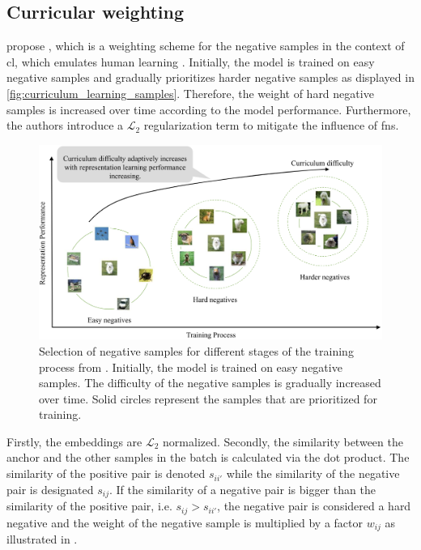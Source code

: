 \subsection{Curricular weighting}\label{subsec:curricular_weighting}


\citet{curricular_weighting_2024} propose \curricularWeighting, 
which is a weighting scheme for the negative samples 
in the context of \ac{cl}, which emulates human learning \citep{curriculum_wang_2022,curriculum_HGNNs_2024}.
Initially, the model is trained on easy negative samples and gradually prioritizes harder negative samples 
as displayed in \autoref{fig:curriculum_learning_samples}. %
Therefore, the weight of hard negative samples is increased over time according to the model performance.
Furthermore, the authors introduce a $\mathcal{L}_2$ regularization term to mitigate the influence of \acp{fn}.

\begin{figure}[!htb] %
    \centering
    \includegraphics[width=360pt]{images/curriculum_learning_samples.png}
    \caption{Selection of negative samples for different stages of the training process 
    from \citet{curricular_weighting_2024}.
    Initially, the model is trained on easy negative samples.
    The difficulty of the negative samples is gradually increased over time.
    Solid circles represent the samples that are prioritized for training.
    }
    \label{fig:curriculum_learning_samples}
\end{figure}

Firstly, the embeddings are $\mathcal{L}_2$ normalized.
Secondly, the similarity between the anchor and the other samples in the batch is calculated via the dot product.
The similarity of the positive pair is denoted $s_{ii'}$ while the similarity of the negative pair is designated $s_{ij}$.
If the similarity of a negative pair is bigger than the similarity of the positive pair, 
i.e. $s_{ij} > s_{ii'}$, the negative pair is considered a hard negative and 
the weight of the negative sample is multiplied by a factor $w_{ij}$ 
as illustrated in .

